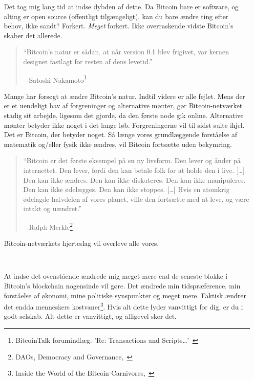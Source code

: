 Det tog mig lang tid at indse dybden af dette. Da Bitcoin bare er software, 
og alting er open source (offentligt tilgængeligt), kan du bare ændre ting 
efter behov, ikke sandt? Forkert. \textit{Meget} forkert. Ikke overraskende 
vidste Bitcoin's skaber det allerede.

\begin{quotation}\begin{samepage}
\enquote{Bitcoin's natur er sådan, at når version 0.1 blev frigivet, var kernen
designet fastlagt for resten af dens levetid.}
\begin{flushright} -- Satoshi Nakamoto\footnote{BitcoinTalk forumindlæg: 'Re:
Transactions and Scripts\ldots'~\cite{satoshi-set-in-stone}}
\end{flushright}\end{samepage}\end{quotation}

Mange har forsøgt at ændre Bitcoin's natur. Indtil videre er alle
fejlet. Mens der er et uendeligt hav af forgreninger og alternative mønter,
gør Bitcoin-netværket stadig sit arbejde, ligesom det gjorde, da den første
node gik online. Alternative mønter betyder ikke noget i det lange løb. 
Forgreningerne vil til sidst sulte ihjel. Det er Bitcoin, der betyder noget. 
Så længe vores grundlæggende forståelse af matematik og/eller fysik ikke ændres,
vil Bitcoin fortsætte uden bekymring.

\begin{quotation}\begin{samepage}
\enquote{Bitcoin er det første eksempel på en ny livsform. Den lever og ånder
på internettet. Den lever, fordi den kan betale folk for at holde den i live.
[\ldots] Den kan ikke ændres. Den kan ikke diskuteres. Den kan ikke manipuleres.
Den kan ikke ødelægges. Den kan ikke stoppes. [\ldots] Hvis en atomkrig 
ødelagde halvdelen af vores planet, ville den fortsætte med at leve, og være 
intakt og uændret.}
\begin{flushright} -- Ralph Merkle\footnote{DAOs, Democracy and
Governance,~\cite{merkle-dao}} 
\end{flushright}\end{samepage}\end{quotation}

Bitcoin-netværkets hjerteslag vil overleve alle vores.

~

At indse det ovenstående ændrede mig meget mere end de seneste blokke i 
Bitcoin's blockchain nogensinde vil gøre. Det ændrede min tidspræference, min
forståelse af økonomi, mine politiske synspunkter og meget mere. Faktisk ændrer
det endda menneskers kostvaner\footnote{Inside the World of the Bitcoin
Carnivores,~\cite{carnivores}}. Hvis alt dette lyder vanvittigt for dig, er du
i godt selskab. Alt dette er vanvittigt, og alligevel sker det.

